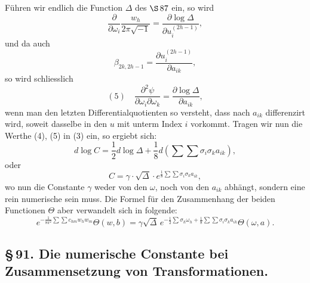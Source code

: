 \documentclass[10pt]{article}
\begin{document}
Führen wir endlich die Function \(\Delta\) des \(\S\,87\) ein, so wird
\[
\frac{\partial}{\partial\omega_i}\frac{w_h}{2\pi\sqrt{-1}}
=
\frac{\partial\log\Delta}{\partial u_i^{(2h-1)}},
\]
und da auch
\[
\beta_{2k,2h-1}=\frac{\partial u_i^{(2h-1)}}{\partial a_{ik}},
\]
so wird schliesslich
\[
(5)\quad
\frac{\partial^2\psi}{\partial\omega_i\partial\omega_k}
=
\frac{\partial\log\Delta}{\partial a_{ik}},
\]
wenn man den letzten Differentialquotienten so versteht, dass nach \(a_{ik}\) differenzirt wird, soweit dasselbe in den \(u\) mit unterm Index \(i\) vorkommt. Tragen wir nun die Werthe (4), (5) in (3) ein, so ergiebt sich:
\[
d\log C=\frac12d\log\Delta+\frac18d\!\left(\sum\sum\sigma_i\sigma_ka_{ik}\right),
\]
oder
\[
C=\gamma\cdot\sqrt{\Delta}\cdot e^{\frac18\sum\sum\sigma_i\sigma_ka_{ik}},
\]
wo nun die Constante \(\gamma\) weder von den \(\omega\), noch von den \(a_{ik}\) abhängt, sondern eine rein numerische sein muss. Die Formel für den Zusammenhang der beiden Functionen \(\Theta\) aber verwandelt sich in folgende:
\[
e^{-\frac{1}{8\pi^2}\sum\sum c_{hm}w_hw_m}
\Theta(w,b)
=
\gamma\sqrt{\Delta}\,
e^{-\frac12\sum\sigma_h\omega_h+\frac18\sum\sum\sigma_i\sigma_ka_{ik}}
\Theta(\omega,a).
\]



\subsection*{\S\,91. Die numerische Constante bei Zusammensetzung von Transformationen.}
\end{document}
